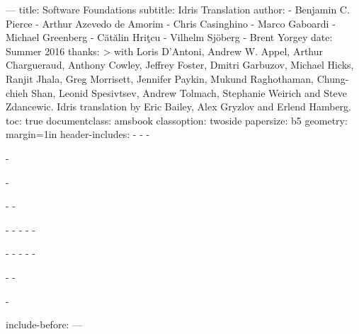 ---
title: Software Foundations
subtitle: Idris Translation
author:
- Benjamin C. Pierce
- Arthur Azevedo de Amorim
- Chris Casinghino
- Marco Gaboardi
- Michael Greenberg
- Cătălin Hriţcu
- Vilhelm Sjöberg
- Brent Yorgey
date: Summer 2016
thanks: >
  with Loris D'Antoni, Andrew W. Appel, Arthur Chargueraud, Anthony Cowley,
  Jeffrey Foster, Dmitri Garbuzov, Michael Hicks, Ranjit Jhala, Greg Morrisett,
  Jennifer Paykin, Mukund Raghothaman, Chung-chieh Shan, Leonid Spesivtsev,
  Andrew Tolmach, Stephanie Weirich and Steve Zdancewic.\newline\newline
  Idris translation by Eric Bailey, Alex Gryzlov and Erlend Hamberg.
toc: true
documentclass: amsbook
classoption: twoside
papersize: b5
geometry: margin=1in
header-includes:
- \setmonofont{Iosevka}
-
- \usepackage[utf8]{inputenc}
- \usepackage{newunicodechar}
- 

-
- \usepackage{minted}
- 
- 
- 
-
- \usepackage[xindy]{glossaries}
- \makeglossaries
- 
- \renewcommand*{\glstextformat}[1]{\textsl{#1}}
-
- \usepackage{todonotes}
-
- \usepackage{ebproof}
- \usepackage{dirtytalk}
include-before: \frontmatter
---

\mainmatter
